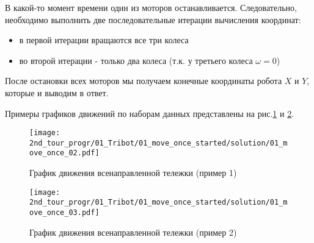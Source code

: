 В какой-то момент времени один из моторов останавливается. Следовательно, необходимо выполнить две последовательные итерации вычисления координат: 
\begin{itemize}
	\item в первой итерации вращаются все три колеса
	\item во второй итерации - только два колеса (т.к. у третьего колеса $\omega = 0$)
\end{itemize}

После остановки всех моторов мы получаем конечные координаты робота $X$ и $Y$, которые и выводим в ответ.

Примеры графиков движений по наборам данных представлены на рис.\ref{fig:01_move_once_02} и \ref{fig:01_move_once_03}.

\begin{figure}[h!]
	\centering
	\texttt{[image: 2nd\_tour\_progr/01\_Tribot/01\_move\_once\_started/solution/01\_move\_once\_02.pdf]}
	\caption{График движения всенаправленной тележки (пример 1)}
	\label{fig:01_move_once_02}
\end{figure}
\begin{figure}[h!]
	\centering
	\texttt{[image: 2nd\_tour\_progr/01\_Tribot/01\_move\_once\_started/solution/01\_move\_once\_03.pdf]}
	\caption{График движения всенаправленной тележки (пример 2)}
	\label{fig:01_move_once_03}
\end{figure}


\codeExample

{}
